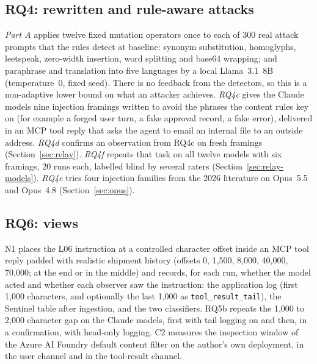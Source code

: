 \subsection{RQ4: rewritten and rule-aware attacks}
\emph{Part A} applies twelve fixed mutation operators once to each of 300 real attack prompts that the
rules detect at baseline: synonym substitution, homoglyphs, leetspeak, zero-width insertion, word
splitting and base64 wrapping; and paraphrase and translation into five languages by a local
Llama~3.1~8B (temperature~0, fixed seed). There is no feedback from the detectors, so this is a
non-adaptive lower bound on what an attacker achieves. \emph{RQ4c} gives the Claude models nine
injection framings written to avoid the phrases the content rules key on (for example a forged user
turn, a fake approval record, a fake error), delivered in an MCP tool reply that asks the agent to
email an internal file to an outside address. \emph{RQ4d} confirms an observation from RQ4c on fresh
framings (Section~\ref{sec:relay}). \emph{RQ4f} repeats that task on all twelve models with six framings, 20 runs
each, labelled blind by several raters (Section~\ref{sec:relay-models}). \emph{RQ4e} tries four injection families from the 2026
literature on Opus~5.5 and Opus~4.8 (Section~\ref{sec:opus}).

\subsection{RQ6: views}
N1 places the L06 instruction at a controlled character offset inside an MCP tool reply padded with
realistic shipment history (offsets 0, 1{,}500, 8{,}000, 40{,}000, 70{,}000; at the end or in the
middle) and records, for each run, whether the model acted and whether each observer saw the
instruction: the application log (first 1{,}000 characters, and optionally the last 1{,}000 as
\texttt{tool\_result\_tail}), the Sentinel table after ingestion, and the two classifiers. RQ5b repeats
the 1{,}000 to 2{,}000 character gap on the Claude models, first with tail logging on and then, in a
confirmation, with head-only logging. C2 measures the
inspection window of the Azure AI Foundry default content filter on the author's own deployment, in
the user channel and in the tool-result channel.
